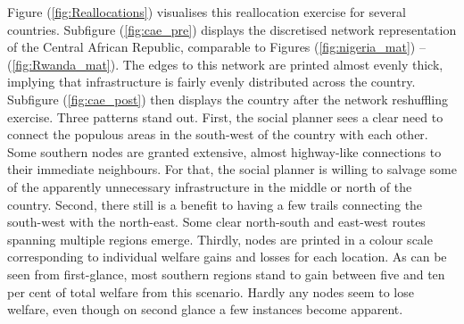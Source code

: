 \documentclass[11pt, oneside]{article}   	%
\let\oldref\ref
\renewcommand{\ref}[1]{(\oldref{#1})}
\begin{document}
Figure \ref{fig:Reallocations} visualises this reallocation exercise for several countries. Subfigure \ref{fig:cae_pre} displays the discretised network representation of the Central African Republic, comparable to Figures \ref{fig:nigeria_mat} -- \ref{fig:Rwanda_mat}. The edges to this network are printed almost evenly thick, implying that infrastructure is fairly evenly distributed across the country. Subfigure \ref{fig:cae_post} then displays the country after the network reshuffling exercise. Three patterns stand out. First, the social planner sees a clear need to connect the populous areas in the south-west of the country with each other. Some southern nodes are granted extensive, almost highway-like connections to their immediate neighbours. For that, the social planner is willing to salvage some of the apparently unnecessary infrastructure in the middle or north of the country. Second, there still is a benefit to having a few trails connecting the south-west with the north-east. Some clear north-south and east-west routes spanning multiple regions emerge. Thirdly, nodes are printed in a colour scale corresponding to individual welfare gains and losses for each location. As can be seen from first-glance, most southern regions stand to gain between five and ten per cent of total welfare from this scenario. Hardly any nodes seem to lose welfare, even though on second glance a few instances become apparent.
\end{document}
